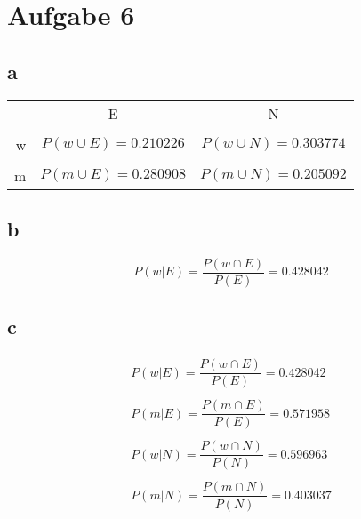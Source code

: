 
\section{Aufgabe 6}
\subsection{a}
\begin{tabular}{rcc}
    &E                          &N                          \\\\
w   &$P(w \cup E) = 0.210226$   &$P(w \cup N) = 0.303774$   \\\\
m   &$P(m \cup E) = 0.280908$   &$P(m \cup N) = 0.205092$   
\end{tabular}

\subsection{b}
\[ P(w|E) = \frac{P(w \cap E)}{P(E)} = 0.428042 \]

\subsection{c}
\[ \begin{array}{l}
P(w|E) = \dfrac{P(w \cap E)}{P(E)} = 0.428042 \\\\
P(m|E) = \dfrac{P(m \cap E)}{P(E)} = 0.571958 \\\\
P(w|N) = \dfrac{P(w \cap N)}{P(N)} = 0.596963 \\\\
P(m|N) = \dfrac{P(m \cap N)}{P(N)} = 0.403037
\end{array}\]
